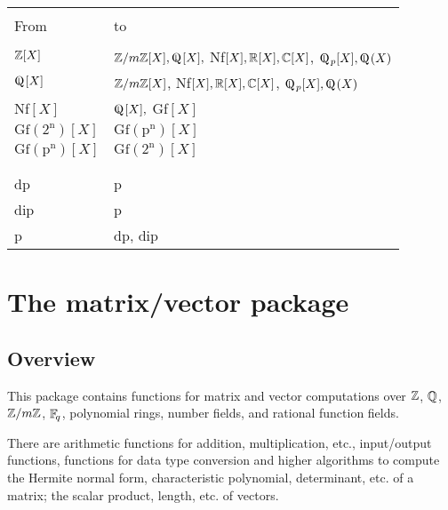 \leer

{\bf
\begin{center}
\begin{tabular}{|p{1.0in}|p{2.5in}|}
\hline &\\[-1.3ex]
From &
to\\[1.5ex]
\hline &\\[-1.3ex]
$\mbox{$\mathbb Z$}[X]$ & $\Z/m\Z[X], \Qfett[X],$ Nf$[X], \mbox{$\mathbb R$}[X], \mbox{$\mathbb C$}[X]$,\newline
          $\Qfett_p[X], \Qfett(X)$\\
$\Qfett[X]$ & $\mbox{$\mathbb Z$}/m\mbox{$\mathbb Z$}[X]$, Nf$[X], \mbox{$\mathbb R$}[X], \mbox{$\mathbb C$}[X]$, \newline
          $\Qfett_p[X], \Qfett(X)$\\
Nf$[X]$ & $\Qfett[X],$ Gf$[X] $\\
$\mbox{Gf}(2^{\mbox{n}})[X]$ & $\mbox{Gf}(\mbox{p}^{\mbox{n}})[X]$ \\
$\mbox{Gf}(\mbox{p}^{\mbox{n}})[X]$ & $\mbox{Gf}(2^{\mbox{n}})[X]$ \\ [1.5ex]
\hline &\\[-1.3ex]
\hline &\\[-1.3ex]
dp & p \\
dip &p \\
p & dp, dip \\[1.5ex]
\hline
\end{tabular}
\end{center} }

\newpage


\section{The matrix/vector package}
\subsection{Overview}
This package contains functions for matrix and vector computations
over $\mbox{$\mathbb Z$}$, $\mbox{$\mathbb Q$}$, $\mbox{$\mathbb Z$}/m\mbox{$\mathbb Z$}$, $\mbox{$\mathbb F$}\!_q$, polynomial rings, number fields, and rational
function fields.

There are arithmetic functions for addition, multiplication, etc., input/output
functions, functions for data type conversion and higher algorithms to compute the Hermite
normal form, characteristic polynomial, determinant, etc. of a matrix; the scalar product,
length, etc. of vectors.

